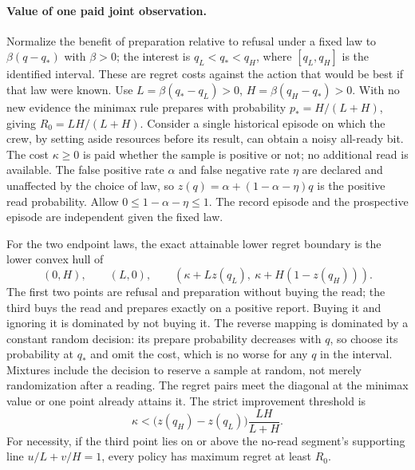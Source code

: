 \documentclass[11pt]{article}
\begin{document}
\paragraph{Value of one paid joint observation.}
Normalize the benefit of preparation relative to refusal under a fixed law to \(\beta(q-q_*)\) with \(\beta>0\); the interest is \(q_L<q_*<q_H\), where \([q_L,q_H]\) is the identified interval. These are regret costs against the action that would be best if that law were known. Use \(L=\beta(q_*-q_L)>0\), \(H=\beta(q_H-q_*)>0\). With no new evidence the minimax rule prepares with probability \(p_*=H/(L+H)\), giving \(R_0=LH/(L+H)\). Consider a single historical episode on which the crew, by setting aside resources before its result, can obtain a noisy all-ready bit. The cost \(\kappa\geq0\) is paid whether the sample is positive or not; no additional read is available. The false positive rate \(\alpha\) and false negative rate \(\eta\) are declared and unaffected by the choice of law, so \(z(q)=\alpha+(1-\alpha-\eta)q\) is the positive read probability. Allow \(0\leq1-\alpha-\eta\leq1\). The record episode and the prospective episode are independent given the fixed law.
\par
For the two endpoint laws, the exact attainable lower regret boundary is the lower convex hull of
\[
 (0,H),\qquad(L,0),\qquad
 (\kappa+Lz(q_L),\ \kappa+H(1-z(q_H))).
\]
The first two points are refusal and preparation without buying the read; the third buys the read and prepares exactly on a positive report. Buying it and ignoring it is dominated by not buying it. The reverse mapping is dominated by a constant random decision: its prepare probability decreases with \(q\), so choose its probability at \(q_*\) and omit the cost, which is no worse for any \(q\) in the interval. Mixtures include the decision to reserve a sample at random, not merely randomization after a reading. The regret pairs meet the diagonal at the minimax value or one point already attains it. The strict improvement threshold is
\[
 \kappa< \bigl(z(q_H)-z(q_L)\bigr)\frac{LH}{L+H}.
\]
For necessity, if the third point lies on or above the no-read segment's supporting line \(u/L+v/H=1\), every policy has maximum regret at least \(R_0\).
\par
\end{document}

